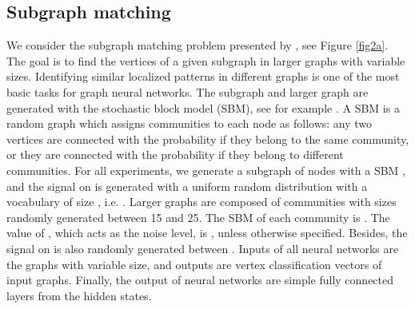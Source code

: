 \documentclass{article} \usepackage{iclr2018_conference,times}
\begin{document}
\subsection{Subgraph matching}

We consider the subgraph matching problem presented by \cite{art:ScarselliGoriTsoiHagenbuchnerMonfardini09}, see Figure \ref{fig2a}. The goal is to find the vertices of a given subgraph  in larger graphs  with variable sizes. Identifying similar localized patterns in different graphs is one of the most basic tasks for graph neural networks. The subgraph  and larger graph  are generated with the stochastic block model (SBM), see for example \cite{art:Abbe17SBM}. A SBM is a random graph which assigns communities to each node as follows: any two vertices are connected with the probability  if they belong to the same community, or they are connected with the probability  if they belong to different communities. For all experiments, we generate a subgraph  of  nodes with a SBM , and the signal on  is generated with a uniform random distribution with a vocabulary of size , i.e. . Larger graphs  are composed of  communities with sizes randomly generated between 15 and 25. The SBM of each community is . The value of , which acts as the noise level, is , unless otherwise specified. Besides, the signal on  is also randomly generated between . Inputs of all neural networks are the graphs with variable size, and outputs are vertex classification vectors of input graphs. Finally, the output of neural networks are simple fully connected layers from the hidden states.
\end{document}
